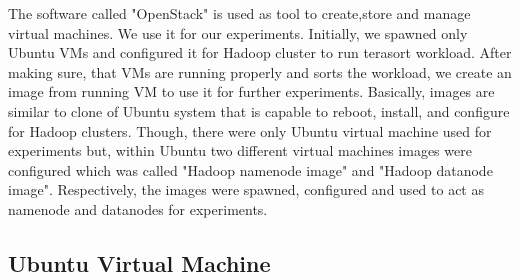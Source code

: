  
The software called "OpenStack" is used as tool to create,store and manage virtual machines. We use it for our experiments. Initially, we spawned only Ubuntu VMs and configured it for Hadoop cluster to run terasort workload. After making sure, that VMs are running properly and sorts the workload, we create an image from  running VM to use it for further experiments. Basically, images are similar to clone of Ubuntu system that is capable to reboot, install, and configure for Hadoop clusters. Though, there were only Ubuntu virtual machine used for experiments but, within Ubuntu two different virtual machines images were configured which was called "Hadoop namenode image" and "Hadoop datanode image". Respectively, the images were spawned, configured and used to act as namenode and datanodes for experiments.\\ 

\subsection{Ubuntu Virtual Machine}

